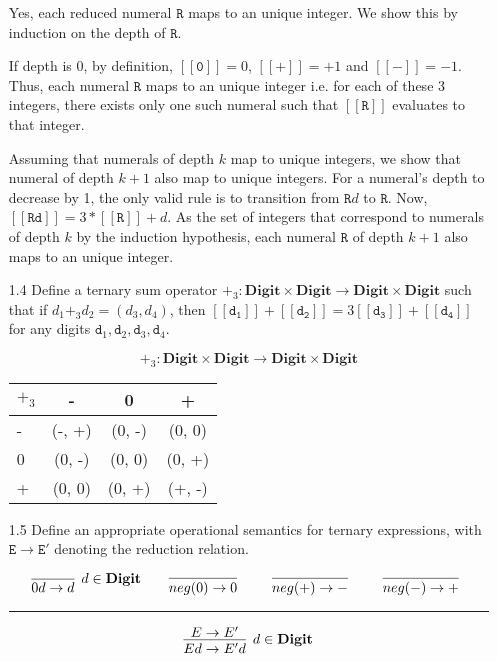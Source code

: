 \documentclass[a4paper,10pt]{article}
\newcommand{\E}{\mathtt{E}}
\newcommand{\R}{\mathtt{R}}
\newcommand{\digit}{\mathtt{d}}
\newcommand{\Digit}{\mathbf{Digit}}
\newcommand{\denot}[1]{\mathtt{[[{#1}]]}}
\newcommand{\question}[1]
{\color{DarkBlue}#1 \color{Black} \newline}
\begin{document}
\begin{enumerate}
Yes, each reduced numeral $\R$ maps to an unique integer. We show this by
induction on the depth of $\R$.

\proof
If depth is 0, by definition, $\denot{0} = 0$, $\denot{+} = +1$ and
$\denot{-} = -1$. Thus, each numeral $\R$ maps to an unique integer i.e.
for each of these 3 integers, there exists only one such numeral such that
$\denot{\R}$ evaluates to that integer.

Assuming that numerals of depth $k$ map to unique integers, we show
that numeral of depth $k+1$ also map to unique integers.
For a numeral's depth to decrease by 1, the only valid rule is
to transition from $\R d$ to $\R$. Now, $\denot{\R d} = 3 * \denot{\R} + d$.
As the set of integers that correspond to numerals of depth $k$ by the
induction hypothesis, 
each numeral $\R$ of depth $k+1$ also maps to an unique integer.

\question{
\item[1.4] Define a ternary sum operator $+_3 : \Digit \times \Digit \to \Digit \times \Digit$ 
such that if $d_1 +_3 d_2 = (d_3,d_4)$, then $\denot{\digit_1} + \denot{\digit_2} = 3
\denot{\digit_3} + \denot{\digit_4}$ for any digits $\digit_1, \digit_2, \digit_3, \digit_4$.
}

\begin{table}[h!]
    \centering
	
	$$ +_3 : \Digit \times \Digit \to \Digit \times \Digit$$ 

	\begin{tabular}{l | c c c}
	$+_3$ & - & 0 & + \\
	\hline
	- & (-, +) & (0, -) & (0, 0) \\
	0 & (0, -) & (0, 0) & (0, +) \\
	+ & (0, 0) & (0, +) & (+, -) \\
	\end{tabular}
\end{table}

\question{
\item[1.5] Define an appropriate operational semantics for ternary expressions, 
with $\E \to \E'$ denoting the reduction relation.
}

\[
\infer[d \in \Digit]
  {0d \rightarrow d}
  {}   
\qquad
\infer[] 
  {neg(0) \rightarrow 0}  
  {}    
\qquad
\infer[] 
  {neg(+) \rightarrow -}  
  {}    
\qquad
\infer[] 
  {neg(-) \rightarrow +}  
  {}    
\]

\hrule

\[
\infer[d \in \Digit]
  {Ed \rightarrow E'd}
  {E \rightarrow E'}
\]


\end{enumerate}
\end{document}
